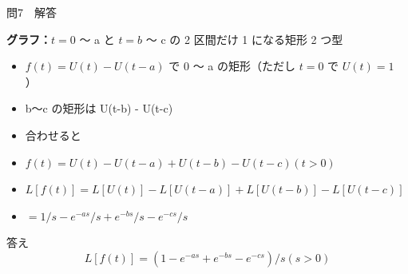 \documentclass[aspectratio=43,professionalfonts,handout]{beamer}
\begin{document}
\begin{frame}{問7　解答}
  \begin{block}{}
  \textbf{グラフ：}$t=0$ 〜 a と $t=b$ 〜 c の 2 区間だけ 1 になる矩形 2 つ型\\[0.3em]
  \begin{itemize}\setlength{\itemsep}{2pt}
    \item $f(t) = U(t) - U(t-a)$ で 0 〜 a の矩形（ただし $t=0$ で $U(t)=1$ ）
    \item b〜c の矩形は U(t-b) - U(t-c)
    \item 合わせると
    \item $f(t) = U(t) - U(t-a) + U(t-b) - U(t-c)  (t > 0)$
    \item $L[f(t)] = L[U(t)] - L[U(t-a)] + L[U(t-b)] - L[U(t-c)]$
    \item $       = 1/s - e^{-as}/s + e^{-bs}/s - e^{-cs}/s$
  \end{itemize}
  \end{block}
  \begin{exampleblock}{答え}
    \[
    L[f(t)] = (1 - e^{-as} + e^{-bs} - e^{-cs})/s  (s > 0)
  \]
  \end{exampleblock}
\end{frame}
\end{document}
